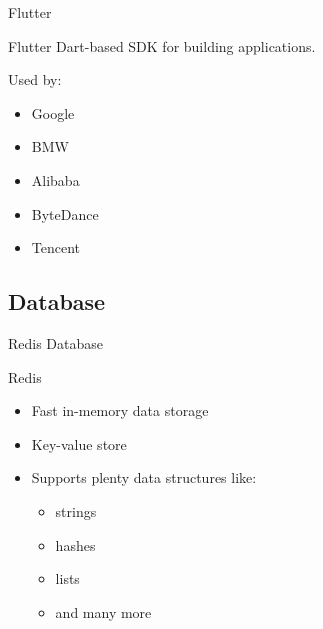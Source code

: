 \documentclass{beamer}
\begin{document}
\begin{frame}[fragile]{Flutter}
    \begin{block}{Flutter}
        Dart-based SDK for building applications.
    \end{block}
    \begin{block}{Used by:}
        \begin{itemize}
            \item Google
            \item BMW
            \item Alibaba
            \item ByteDance
            \item Tencent
        \end{itemize}
    \end{block}

\end{frame}


%

\subsection{Database}%
\label{sub:Database}

\begin{frame}{Redis Database}
    \begin{block}{Redis}
        \begin{itemize}
            \item Fast in-memory data storage
            \item Key-value store
            \item Supports plenty data structures like:
                \begin{itemize}
                    \item strings
                    \item hashes
                    \item lists
                    \item and many more
                \end{itemize}
        \end{itemize}
    \end{block}
\end{frame}
\end{document}
